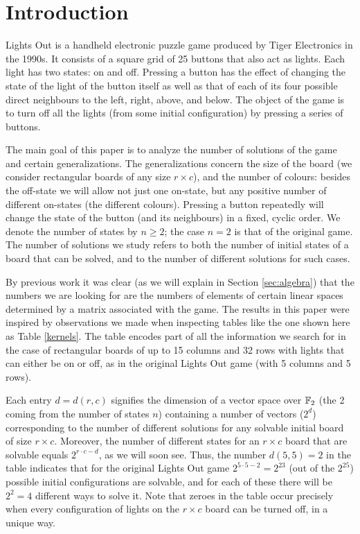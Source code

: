 \section*{Introduction}\label{sec:intro}
Lights Out is a handheld electronic puzzle game produced by Tiger Electronics in
the 1990s. It consists of a square grid of 25 buttons that also act as lights.
Each light has two states: on and off.  Pressing a button has the effect of
changing the state of the light of the button itself as well as that of each of
its four possible direct neighbours to the left, right, above, and below.
The object of the game is to turn off all the lights (from some initial
configuration) by pressing a series of buttons.

The main goal of this paper is to analyze the number of
solutions of the game and certain generalizations.
The generalizations concern the size of the board (we consider
rectangular boards of any size $r\times c$), and the number of colours:
besides the off-state we will allow not just one on-state,
but any positive number of different on-states (the different
colours). Pressing a button repeatedly will change the state
of the button (and its neighbours) in a fixed, cyclic order.
We denote the number of states by $n\geq 2$; the case $n=2$
is that of the original game.
The number of solutions we study refers to both the number of
initial states of a board that can be solved, and to the number
of different solutions for such cases.

By previous work it was clear (as we will explain in
Section \ref{sec:algebra}) that the numbers we are looking for
are the numbers of elements of certain linear spaces determined
by a matrix associated with the game. The results in this paper
were inspired by observations we made when inspecting
tables like the one shown here as Table \ref{kernels}.
The table encodes part of all the information we search for
in the case of rectangular boards of up to 15 columns and
32 rows with lights that can either be on or off, as in the
original Lights Out game (with 5 columns and 5 rows).

Each entry $d=d(r, c)$ signifies the dimension of a vector
space over $\mathbb F_2$ (the 2 coming from the number of states $n$)
containing a number of vectors ($2^d$) corresponding to
the number of different solutions for any solvable initial board
of size $r\times c$.
Moreover, the number of different states for an $r\times c$ board
that are solvable equals $2^{r\cdot c-d}$, as we will soon see.
Thus, the number $d(5,5)=2$ in the table indicates that for
the original Lights Out game $2^{5\cdot 5-2}=2^{23}$ (out of the $2^{25}$)
possible initial configurations are solvable,
and for each of these there will be $2^2=4$ different ways
to solve it.
Note that zeroes in the table occur precisely when 
every configuration of lights on the $r\times c$ board can be
turned off, in a unique way.

